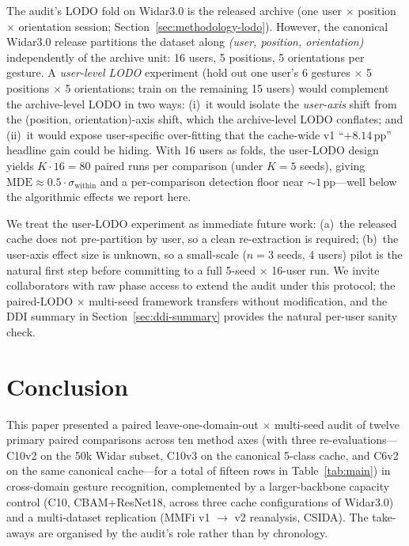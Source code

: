 \documentclass[11pt]{article}
\theoremstyle{definition}
\newcommand{\CSI}{\text{CSI}}
\begin{document}
The audit's LODO fold on Widar3.0 is the released archive (one user $\times$ position $\times$ orientation session; Section~\ref{sec:methodology-lodo}). However, the canonical Widar3.0 release partitions the dataset along \emph{(user, position, orientation)} independently of the archive unit: 16 users, 5 positions, 5 orientations per gesture. A \emph{user-level LODO} experiment (hold out one user's 6 gestures $\times$ 5 positions $\times$ 5 orientations; train on the remaining 15 users) would complement the archive-level LODO in two ways: (i)~it would isolate the \emph{user-axis} shift from the (position, orientation)-axis shift, which the archive-level LODO conflates; and (ii)~it would expose user-specific over-fitting that the cache-wide v1 ``$+8.14$\,pp'' headline gain could be hiding. With 16 users as folds, the user-LODO design yields $K \cdot 16 = 80$ paired runs per comparison (under $K = 5$ seeds), giving $\text{MDE} \approx 0.5 \cdot \sigma_{\text{within}}$ and a per-comparison detection floor near $\sim$$1$\,pp---well below the algorithmic effects we report here.

We treat the user-LODO experiment as immediate future work: (a)~the released cache does not pre-partition by user, so a clean re-extraction is required; (b)~the user-axis effect size is unknown, so a small-scale ($n = 3$ seeds, 4 users) pilot is the natural first step before committing to a full 5-seed $\times$ 16-user run. We invite collaborators with raw phase access to extend the audit under this protocol; the paired-LODO $\times$ multi-seed framework transfers without modification, and the DDI summary in Section~\ref{sec:ddi-summary} provides the natural per-user sanity check.

\section{Conclusion}
\label{sec:conclusion}

This paper presented a paired leave-one-domain-out $\times$ multi-seed audit of twelve primary paired comparisons across ten method axes (with three re-evaluations---C10v2 on the 50k Widar subset, C10v3 on the canonical 5-class cache, and C6v2 on the same canonical cache---for a total of fifteen rows in Table~\ref{tab:main}) in \CSI{} cross-domain gesture recognition, complemented by a larger-backbone capacity control (C10, CBAM+ResNet18, across three cache configurations of Widar3.0) and a multi-dataset replication (MMFi v1 $\rightarrow$ v2 reanalysis, CSIDA). The take-aways are organised by the audit's role rather than by chronology.
\end{document}
